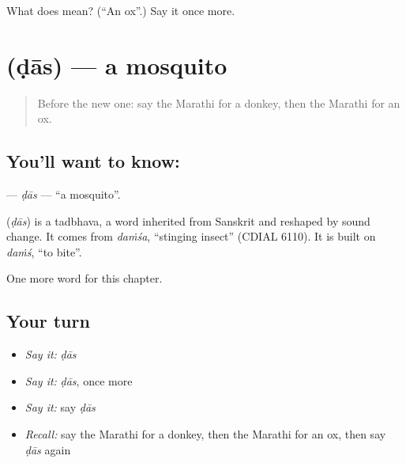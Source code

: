\begin{tcolorbox}[breakable,colback=teal!4,colframe=teal!35!black,title={Before you move on}]
What does  mean? (\textquotedblleft{}An ox\textquotedblright{}.) Say it once more.
\end{tcolorbox}
\section[\texorpdfstring{\mr{डास} (ḍās)}{डास (ḍās)}]{ (ḍās) — a mosquito}

\label{lesson:MR-C144-das}



\begin{quote}
Before the new one: say the Marathi for a donkey, then the Marathi for an ox.
\end{quote}

\subsection*{You'll want to know: }
\textbf{} — \emph{ḍās} — \textquotedblleft{}a mosquito\textquotedblright{}.

\begin{cousinweb}
\textbf{} (\emph{ḍās}) is a tadbhava, a word inherited from Sanskrit and reshaped by sound change. It comes from \emph{daṁśa}, \textquotedblleft{}stinging insect\textquotedblright{} (CDIAL 6110). It is built on \emph{daṁś}, \textquotedblleft{}to bite\textquotedblright{}.
\end{cousinweb}

\begin{grammarlens}[title={What you've built}]
One more word for this chapter.
\end{grammarlens}

\subsection*{Your turn}
\begin{itemize}
\raggedright
  \item \emph{Say it:} \emph{ḍās}
  \item \emph{Say it:} \emph{ḍās}, once more
  \item \emph{Say it:} say \emph{ḍās}
  \item \emph{Recall:} say the Marathi for a donkey, then the Marathi for an ox, then say \emph{ḍās} again
\end{itemize}

